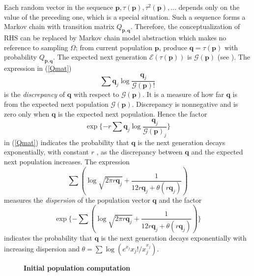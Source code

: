 Each random vector in the sequence $\bm{p}, \tau(\bm{p}), \tau^2(\bm{p}),...$ depends only on the value of the preceding one, 
which is a special situation. Such a sequence forms a Markov chain with transition matrix $Q_{\bm{p},\bm{q}}$. Therefore, 
the conceptualization of RHS can be replaced by Markov chain model abstraction which makes no reference to sampling $\Omega$; 
from current population $\bm{p}$, produce $\bm{q} = \tau (\bm{p})$ with probability $Q_{\bm{p},\bm{q}}$. The expected next generation 
$\mathcal{E}(\tau (\bm{p}))$ is $\mathcal{G}(\bm{p})$ (see \cite{Vose1999}). The expression in (\ref{Qmat})
\[
\sum \bm{q}_j \log \frac{\bm{q}_j}{\mathcal{G}(\bm{p})!}
\]
is the {\em discrepancy} of $\bm{q}$ with respect to $\mathcal{G}(\bm{p})$. It is a measure of how far $\bm{q}$ is from the expected next population 
$\mathcal{G}(\bm{p})$. Discrepancy is nonnegative and is zero only when $\bm{q}$ is the expected next population. Hence the factor 
\[
\exp\{-r \sum \bm{q}_j \log \frac{\bm{q}_j}{\mathcal{G}(\bm{p})_j}\}
\]
in (\ref{Qmat}) indicates the probability that $\bm{q}$ is the next generation
decays exponentially, with constant $r$ , as the discrepancy between $\bm{q}$ and the
expected next population increases.
The expression 
\[
\sum (\log \sqrt{2 \pi r\bm{q}_j} + \frac{1}{12r\bm{q}_j + \theta (r\bm{q}_j)})
\]
measures the {\em dispersion} of the population vector $\bm{q}$ and the factor
\[
\exp\{- \sum (\log \sqrt{2 \pi r\bm{q}_j} + \frac{1}{12r\bm{q}_j + \theta (r\bm{q}_j)})\}
\]
indicates the probability that $\bm{q}$ is the next generation decays exponentially with increasing dispersion and 
$\theta  =  \sum \log(e^{x_j}x_j!/x_j^{x_j})$.

\begin{figure}[H]
\begin{center}
\hspace{4pt}
\caption{\textbf{Initial population computation} }
\label{tetra_popn}
\end{center}
\end{figure}

